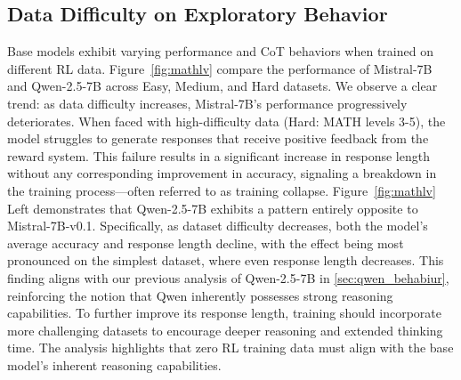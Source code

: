 \documentclass{article} %
\newcommand{\jh}[1]{\textcolor{magenta}{\bf\small [#1 --JH]}}
\begin{document}
\subsection{Data Difficulty on Exploratory Behavior}
\label{sec:data_complextiy_behaviur}
Base models exhibit varying performance and CoT behaviors when trained on different RL data. Figure~\ref{fig:mathlv} compare the performance of Mistral-7B and Qwen-2.5-7B across Easy, Medium, and Hard datasets. We observe a clear trend: as data difficulty increases, Mistral-7B's performance progressively deteriorates. When faced with high-difficulty data (Hard: MATH levels 3-5), the model struggles to generate responses that receive positive feedback from the reward system. This failure results in a significant increase in response length without any corresponding improvement in accuracy, signaling a breakdown in the training process—often referred to as training collapse. Figure~\ref{fig:mathlv} Left demonstrates that Qwen-2.5-7B exhibits a pattern entirely opposite to Mistral-7B-v0.1. Specifically, as dataset difficulty decreases, both the model’s average accuracy and response length decline, with the effect being most pronounced on the simplest dataset, where even response length decreases. This finding aligns with our previous analysis of Qwen-2.5-7B in \textsection\ref{sec:qwen_behabiur}, reinforcing the notion that Qwen inherently possesses strong reasoning capabilities. To further improve its response length, training should incorporate more challenging datasets to encourage deeper reasoning and extended thinking time.
The analysis highlights that zero RL training data must align with the base model's inherent reasoning capabilities.

\end{document}
